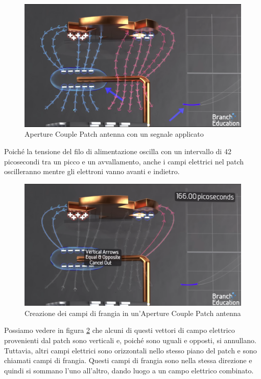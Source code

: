 \begin{figure}[htbp]
  \centering
  \includegraphics[width=0.8\linewidth]{./res/img/antenna_voltage_applied.png}
  \caption{Aperture Couple Patch antenna con un segnale applicato \cite{branch_education_how_2022}}
  \label{fig:aperture-couple-patch-antenna-voltage-applied}
\end{figure}

Poiché la tensione del filo di alimentazione oscilla con un intervallo di 42 picosecondi tra un picco e un avvallamento, anche i campi elettrici nel patch oscilleranno mentre gli elettroni vanno avanti e indietro.

\begin{figure}[htbp]
  \centering
  \includegraphics[width=0.8\linewidth]{./res/img/antenna_fringing_fields.png}
  \caption{Creazione dei campi di frangia in un'Aperture Couple Patch antenna \cite{branch_education_how_2022}}
  \label{fig:aperture-couple-patch-antenna-fringing-fields}
\end{figure}

Possiamo vedere in figura \ref{fig:aperture-couple-patch-antenna-fringing-fields} che alcuni di questi vettori di campo elettrico provenienti dal patch sono verticali e, poiché sono uguali e opposti, si annullano.
Tuttavia, altri campi elettrici sono orizzontali nello stesso piano del patch e sono chiamati campi di frangia.
Questi campi di frangia sono nella stessa direzione e quindi si sommano l'uno all'altro, dando luogo a un campo elettrico combinato.\cite{branch_education_how_2022}

